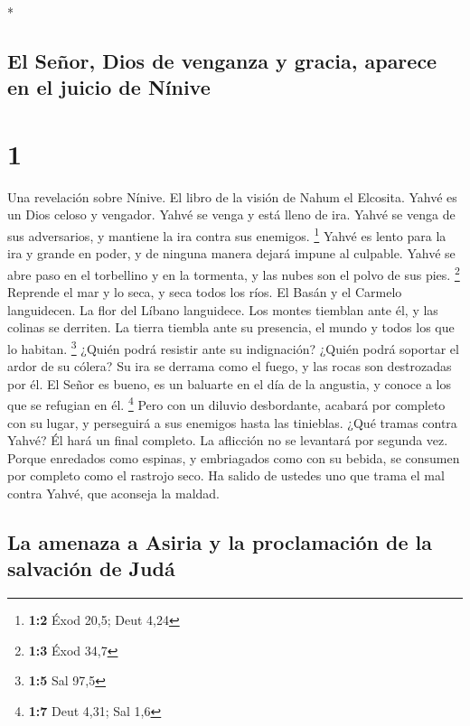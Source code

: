 \begin{paracol}{2} \switchcolumn[0]*

\hypertarget{el-seuxf1or-dios-de-venganza-y-gracia-aparece-en-el-juicio-de-nuxednive}{%
\subsection{El Señor, Dios de venganza y gracia, aparece en el juicio de
Nínive}\label{el-seuxf1or-dios-de-venganza-y-gracia-aparece-en-el-juicio-de-nuxednive}}

\hypertarget{section}{%
\section{1}\label{section}}

 Una revelación sobre Nínive. El libro de la visión de
Nahum el Elcosita.  Yahvé es un Dios celoso y vengador.
Yahvé se venga y está lleno de ira. Yahvé se venga de sus adversarios, y
mantiene la ira contra sus enemigos. \footnote{\textbf{1:2} Éxod 20,5;
  Deut 4,24}  Yahvé es lento para la ira y grande en
poder, y de ninguna manera dejará impune al culpable. Yahvé se abre paso
en el torbellino y en la tormenta, y las nubes son el polvo de sus pies.
\footnote{\textbf{1:3} Éxod 34,7}  Reprende el mar y lo
seca, y seca todos los ríos. El Basán y el Carmelo languidecen. La flor
del Líbano languidece.  Los montes tiemblan ante él, y las
colinas se derriten. La tierra tiembla ante su presencia, el mundo y
todos los que lo habitan. \footnote{\textbf{1:5} Sal 97,5}
 ¿Quién podrá resistir ante su indignación? ¿Quién podrá
soportar el ardor de su cólera? Su ira se derrama como el fuego, y las
rocas son destrozadas por él.  El Señor es bueno, es un
baluarte en el día de la angustia, y conoce a los que se refugian en él.
\footnote{\textbf{1:7} Deut 4,31; Sal 1,6}  Pero con un
diluvio desbordante, acabará por completo con su lugar, y perseguirá a
sus enemigos hasta las tinieblas.  ¿Qué tramas contra
Yahvé? Él hará un final completo. La aflicción no se levantará por
segunda vez.  Porque enredados como espinas, y
embriagados como con su bebida, se consumen por completo como el
rastrojo seco.  Ha salido de ustedes uno que trama el mal
contra Yahvé, que aconseja la maldad.

\hypertarget{la-amenaza-a-asiria-y-la-proclamaciuxf3n-de-la-salvaciuxf3n-de-juduxe1}{%
\subsection{La amenaza a Asiria y la proclamación de la salvación de
Judá}\label{la-amenaza-a-asiria-y-la-proclamaciuxf3n-de-la-salvaciuxf3n-de-juduxe1}}


\end{paracol}
